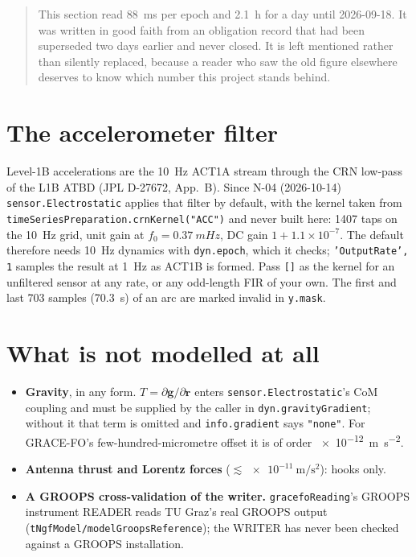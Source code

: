 \documentclass[11pt,a4paper]{report}
\newcommand{\vv}[1]{\bm{#1}}
\begin{document}
\begin{quote}\footnotesize
This section read \SI{88}{\milli\second} per epoch and \SI{2.1}{\hour} for a day until 2026-09-18. It
was written in good faith from an obligation record that had been superseded two days earlier and
never closed. It is left mentioned rather than silently replaced, because a reader who saw the old
figure elsewhere deserves to know which number this project stands behind.
\end{quote}

\section{The accelerometer filter}
Level-1B accelerations are the \SI{10}{Hz} ACT1A stream through the CRN low-pass of the L1B ATBD
(JPL D-27672, App.~B). Since N-04 (2026-10-14) \texttt{sensor.Electrostatic} applies that filter by
default, with the kernel taken from \texttt{timeSeriesPreparation.crnKernel("ACC")} and never built
here: 1407 taps on the \SI{10}{Hz} grid, unit gain at $f_0 = \SI{0.37}{mHz}$, DC gain
$1 + 1.1\times10^{-7}$. The default therefore needs \SI{10}{Hz} dynamics with \texttt{dyn.epoch}, which
it checks; \texttt{'OutputRate', 1} samples the result at \SI{1}{Hz} as ACT1B is formed. Pass
\texttt{[]} as the kernel for an unfiltered sensor at any rate, or any odd-length FIR of your own.
The first and last 703 samples (\SI{70.3}{s}) of an arc are marked invalid in \texttt{y.mask}.

\section{What is not modelled at all}
\begin{itemize}[leftmargin=1.4em]
\item \textbf{Gravity}, in any form. $T=\partial\vv g/\partial\vv r$ enters
 \texttt{sensor.Electrostatic}'s CoM coupling and must be supplied by the caller in
 \texttt{dyn.gravityGradient}; without it that term is omitted and \texttt{info.gradient} says
 \texttt{"none"}. For GRACE-FO's few-hundred-micrometre offset it is of order
 \SI{e-12}{\metre\per\second\squared}.
\item \textbf{Antenna thrust and Lorentz forces} ($\lesssim\SI{e-11}{\metre\per\second\squared}$):
 hooks only.
\item \textbf{A GROOPS cross-validation of the writer.} \texttt{gracefoReading}'s GROOPS instrument
 READER reads TU Graz's real GROOPS output (\texttt{tNgfModel/modelGroopsReference}); the WRITER has
 never been checked against a GROOPS installation.
\end{itemize}
\end{document}
